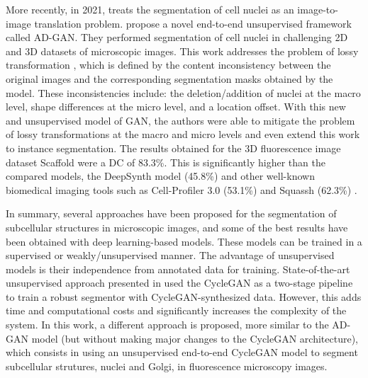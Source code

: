 More recently, in 2021, \cite{adgan} treats the segmentation of cell nuclei as an image-to-image translation problem. \citet{adgan} propose a novel end-to-end unsupervised framework called \ac{AD-GAN}. They performed segmentation of cell nuclei in challenging \ac{2D} and \ac{3D} datasets of microscopic images. This work addresses the problem of lossy transformation \cite{lossy:cyclegan}, which is defined by the content inconsistency between the original images and the corresponding segmentation masks obtained by the model. These inconsistencies include: the deletion/addition of nuclei at the macro level, shape differences at the micro level, and a location offset. With this new and unsupervised model of \ac{GAN}, the authors were able to mitigate the problem of lossy transformations at the macro and micro levels and even extend this work to instance segmentation. The results obtained for the \ac{3D} fluorescence image dataset Scaffold \cite{dataset} were a \ac{DC} of 83.3\%. This is significantly higher than the compared models, the DeepSynth model \cite{deepsynth} (45.8\%) and other well-known biomedical imaging tools such as Cell-Profiler 3.0 \cite{cellprofiler} (53.1\%) and Squassh (62.3\%) \cite{squassh}.

In summary, several approaches have been proposed for the segmentation of subcellular structures in microscopic images, and some of the best results have been obtained with deep learning-based models. These models can be trained in a supervised or weakly/unsupervised manner. The advantage of unsupervised models is their independence from annotated data for training. State-of-the-art unsupervised approach presented in \cite{deepsynth} used the CycleGAN as a two-stage pipeline to train a robust segmentor with CycleGAN-synthesized data. However, this adds time and computational costs and significantly increases the complexity of the system. In this work, a different approach is proposed, more similar to the \ac{AD-GAN} model (but without making major changes to the CycleGAN architecture), which consists in using an unsupervised end-to-end CycleGAN model to segment subcellular strutures, nuclei and Golgi, in fluorescence microscopy images.


